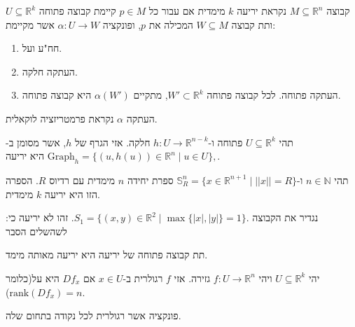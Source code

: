 \documentclass{tstextbook}
\begin{document}
\begin{definition}
קבוצה \(M\subseteq \mathbb{R}^{n}\) נקראת יריעה \(k\) מימדית אם עבור כל \(p \in M\) קיימת קבוצה פתוחה \(U \subseteq \mathbb{R}^{k}\) ותת קבוצה \(W\subseteq M\) המכילה את \(p\), ופונקציה \(\alpha:U\to W\) אשר מקיימת:

  \begin{enumerate}
    \item חח"ע ועל. 


    \item העתקה חלקה. 


    \item העתקה פתוחה. לכל קבוצה פתוחה \(W' \subset \mathbb{R}^{k}\), מתקיים \(\alpha(W')\) היא קבוצה פתוחה. 


  \end{enumerate}
\end{definition}
\begin{remark}
העתקה \(\alpha\) נקראת פרמטריזציה לוקאלית.

\end{remark}
\begin{example}
תהי \(U\subseteq \mathbb{R}^{k}\) פתוחה ו-\(h:U\to \mathbb{R}^{n-k}\) חלקה. אזי הגרף של \(h\), אשר מסומן ב-\(\text{Graph}_{h}=\{(u,h(u))\in\mathbb{R}^{n}\mid u\in U\},\) היא יריעה.

\end{example}
\begin{example}
תהי \(n \in \mathbb{N}\) ו-\(\mathbb{S}_{R}^{n}=\{x\in\mathbb{R}^{n+1}\mid||x||=R\}\) ספרת יחידה \(n\) מימדית עם רדיוס \(R\). הספרה הזו היא יריעה \(k\) מימדית.

\end{example}
\begin{example}
נגדיר את הקבוצה \(S_{1}=\{(x,y)\in\mathbb{R}^{2}\mid\operatorname*{max}\{|x|,|y|\}=1\}.\). זהו לא יריעה כי:
לשהשלים הסבר

\end{example}
\begin{proposition}
תת קבוצה פתוחה של יריעה היא יריעה מאותה מימד.

\end{proposition}
\begin{definition}
יהי \(U\subseteq \mathbb{R}^{k}\) ויהי \(f:U\to \mathbb{R}^{n}\) גזירה. אזי \(f\) רגולרית ב-\(x \in U\) אם \(Df_{x}\) היא על(כלומר \(\text{rank}(Df_{x})=n\)).

\end{definition}
\begin{definition}
פונקציה אשר רגולרית לכל נקודה בתחום שלה.

\end{definition}
\end{document}
